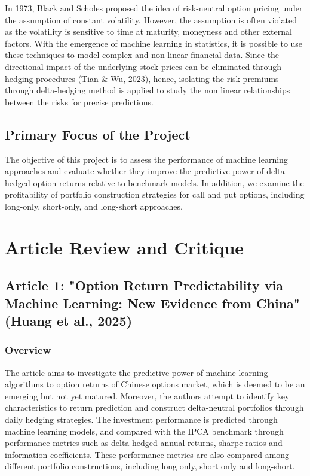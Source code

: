 \documentclass[oneside, 12pt]{article}
\newcommand*{\1}{\text{\scalebox{1.1}{\usefont{U}{bbold}{m}{n}1}}}
\begin{document}
In 1973, Black and Scholes proposed the idea of risk-neutral option pricing under the assumption of constant volatility. However, the assumption is often violated as the volatility is sensitive to time at maturity, moneyness and other external factors. With the emergence of machine learning in statistics, it is possible to use these techniques to model complex and non-linear financial data. Since the directional impact of the underlying stock prices can be eliminated through hedging procedures (Tian \& Wu, 2023), hence, isolating the risk premiums through delta-hedging method is applied to study the non linear relationships between the risks for precise predictions. 

\subsection{Primary Focus of the Project}
The objective of this project is to assess the performance of machine learning approaches and evaluate whether they improve the predictive power of delta-hedged option returns relative to benchmark models. In addition, we examine the profitability of portfolio construction strategies for call and put options, including long-only, short-only, and long-short approaches.

\newpage

\section{Article Review and Critique}
\subsection{Article 1: "Option Return Predictability via Machine Learning:  New Evidence from China" (Huang et al., 2025)}
\subsubsection{Overview}
The article aims to investigate the predictive power of machine learning algorithms to option returns of Chinese options market, which is deemed to be an emerging but not yet matured. Moreover, the authors attempt to identify key characteristics to return prediction and construct delta-neutral portfolios through daily hedging strategies. The investment performance is predicted through machine learning models, and compared with the IPCA benchmark through performance metrics such as delta-hedged annual returns, sharpe ratios and information coefficients. These performance metrics are also compared among different portfolio constructions, including long only, short only and long-short. \newline
\end{document}
